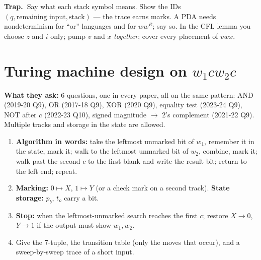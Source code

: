 \documentclass[10.5pt,a4paper]{article}
\newcommand{\TRAP}{\textbf{\color{trapborder}Trap.\ }}
\newcommand{\asked}[1]{{\small\color{gray!60!black}\textbf{What they ask:} #1}\par}
\begin{document}
\begin{trap}\TRAP Say what each stack symbol means. Show the IDs $(q,\text{remaining input},\text{stack})$ --- the trace earns marks.
A PDA needs nondeterminism for ``or'' languages and for $ww^R$; say so. In the CFL lemma you choose $z$ and $i$ only; pump $v$ and $x$
\emph{together}; cover every placement of $vwx$.\end{trap}

\section{Turing machine design on $w_1cw_2c$}
\asked{6 questions, one in every paper, all on the same pattern: AND (2019-20 Q9), OR (2017-18 Q9), XOR (2020 Q9), equality test
(2023-24 Q9), NOT after $c$ (2022-23 Q10), signed magnitude $\to$ 2's complement (2021-22 Q9). Multiple tracks and storage in the state are allowed.}
\begin{recipe}
\begin{enumerate}
\item \textbf{Algorithm in words:} take the leftmost unmarked bit of $w_1$, remember it in the state, mark it; walk to the leftmost unmarked bit
of $w_2$, combine, mark it; walk past the second $c$ to the first blank and write the result bit; return to the left end; repeat.
\item \textbf{Marking:} $0\mapsto X$, $1\mapsto Y$ (or a check mark on a second track). \textbf{State storage:} $p_b$, $t_o$ carry a bit.
\item \textbf{Stop:} when the leftmost-unmarked search reaches the first $c$; restore $X\to0$, $Y\to1$ if the output must show $w_1,w_2$.
\item Give the 7-tuple, the transition table (only the moves that occur), and a sweep-by-sweep trace of a short input.
\end{enumerate}
\end{recipe}
\end{document}
